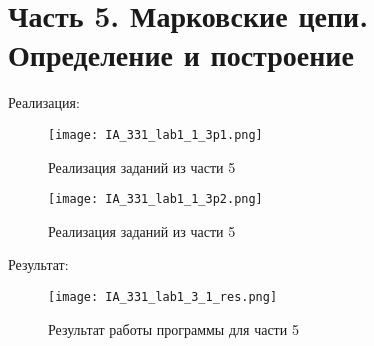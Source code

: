 \chapter{Часть 5. Марковские цепи. Определение и построение}
\label{ch:сhap5}

Реализация:\\

\begin{figure}[ht]
    \centering
    \texttt{[image: IA\_331\_lab1\_1\_3p1.png]}
    \caption{Реализация заданий из части 5}
    \label{fig:open_audio}
\end{figure}

\begin{figure}[ht]
    \centering
    \texttt{[image: IA\_331\_lab1\_1\_3p2.png]}
    \caption{Реализация заданий из части 5}
    \label{fig:open_audio}
\end{figure}

Результат:

\begin{figure}[ht]
    \centering
    \texttt{[image: IA\_331\_lab1\_3\_1\_res.png]}
    \caption{Результат работы программы для части 5}
    \label{fig:open_audio}
\end{figure}


\endinput